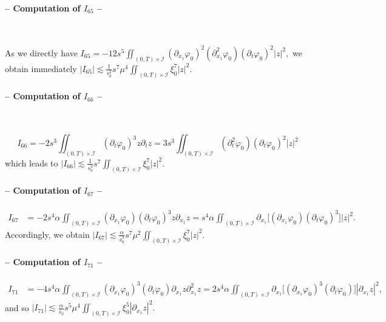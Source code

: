 \documentclass[a4paper, 12pt]{article}
\theoremstyle{plain}
\theoremstyle{definition}
\numberwithin{theorem}{section}
\numberwithin{equation}{section}
\begin{document}
{\paragraph{-- Computation of $I_{65}$ --} $~$
\smallskip

As we directly have
$ \displaystyle
I_{65}=-12s^5\iint_{(0,T)\times\mathcal{I}}(\partial_{x_1}\varphi_0)^2(\partial^2_{x_1}\varphi_0)(\partial_t\varphi_0)^2|z|^2,
$
we  obtain immediately
$ \displaystyle
|I_{65}|\lesssim \frac{1}{s_0^2}s^7\mu^4\iint_{(0,T)\times\mathcal{I}}\xi_0^7|z|^2.
$
\paragraph{-- Computation of $I_{66}$ --} $~$
\smallskip

$$ \displaystyle I_{66} =-2s^3\iint_{(0,T)\times\mathcal{I}}(\partial_t\varphi_0)^3z\partial_tz=3s^3\iint_{(0,T)\times\mathcal{I}}(\partial^2_t\varphi_0)(\partial_t\varphi_0)^2|z|^2$$
which leads to $\displaystyle |I_{66}| \lesssim \frac{1}{s_0^4}s^7\iint_{(0,T)\times\mathcal{I}}\xi_0^7|z|^2$.

\paragraph{-- Computation of $I_{67}$ --}
\begin{align*}
I_{67}&=-2s^4\alpha \iint_{(0,T)\times\mathcal{I}}(\partial_{x_1}\varphi_0)(\partial_t\varphi_0)^3z\partial_{x_1}z=s^4\alpha\iint_{(0,T)\times\mathcal{I}}\partial_{x_1}\big[(\partial_{x_1}\varphi_0)(\partial_t\varphi_0)^3\big]|z|^2. \end{align*}
Accordingly, we obtain $ \displaystyle |I_{67}| \lesssim \frac{\alpha}{s_0^3} s^7\mu^2\iint_{(0,T)\times\mathcal{I}}\xi_0^7|z|^2$.

\paragraph{-- Computation of $I_{71}$ --}
\begin{align*}
I_{71}& =-4s^4\alpha  \iint_{(0,T)\times\mathcal{I}}(\partial_{x_1}\varphi_0)^3(\partial_t\varphi_0)\partial_{x_1}z\partial^2_{x_1}z=2s^4\alpha  \iint_{(0,T)\times\mathcal{I}}\partial_{x_1}\big[(\partial_{x_1}\varphi_0)^3(\partial_t\varphi_0)\big]|\partial_{x_1}z|^2,\end{align*}
and so
$ \displaystyle
|I_{71}| \lesssim \frac{\alpha}{s_0} s^5\mu^4\iint_{(0,T)\times\mathcal{I}}\xi_0^5|\partial_{x_1}z|^2.
$
}
\end{document}
